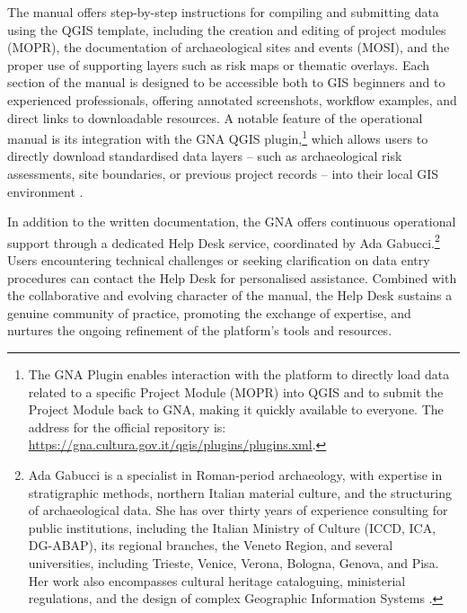 \begin{spacing}{1.5}
The manual offers step-by-step instructions for compiling and submitting data using the QGIS template, including the creation and editing of project modules (MOPR), the documentation of archaeological sites and events (MOSI), and the proper use of supporting layers such as risk maps or thematic overlays. Each section of the manual is designed to be accessible both to GIS beginners and to experienced professionals, offering annotated screenshots, workflow examples, and direct links to downloadable resources. A notable feature of the operational manual is its integration with the GNA QGIS plugin,\footnote{The GNA Plugin enables interaction with the platform to directly load data related to a specific Project Module (MOPR) into QGIS and to submit the Project Module back to GNA, making it quickly available to everyone. The address for the official repository is: \url{https://gna.cultura.gov.it/qgis/plugins/plugins.xml}.} which allows users to directly download standardised data layers -- such as archaeological risk assessments, site boundaries, or previous project records -- into their local GIS environment \citep{gabucci_template_2023}.

In addition to the written documentation, the GNA offers continuous operational support through a dedicated Help Desk service, coordinated by Ada Gabucci.\footnote{Ada Gabucci is a specialist in Roman-period archaeology, with expertise in stratigraphic methods, northern Italian material culture, and the structuring of archaeological data. She has over thirty years of experience consulting for public institutions, including the Italian Ministry of Culture (ICCD, ICA, DG-ABAP), its regional branches, the Veneto Region, and several universities, including Trieste, Venice, Verona, Bologna, Genova, and Pisa. Her work also encompasses cultural heritage cataloguing, ministerial regulations, and the design of complex Geographic Information Systems \parencite{noauthor_ada_2025}.} Users encountering technical challenges or seeking clarification on data entry procedures can contact the Help Desk for personalised assistance. Combined with the collaborative and evolving character of the manual, the Help Desk sustains a genuine community of practice, promoting the exchange of expertise, and nurtures the ongoing refinement of the platform’s tools and resources.


\end{spacing}
